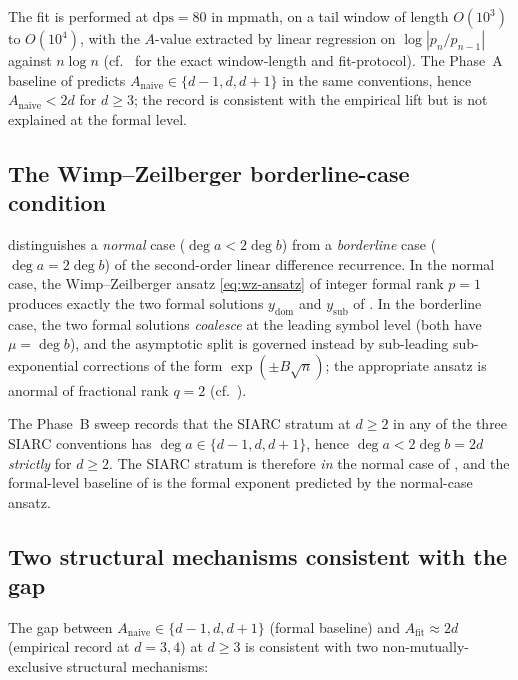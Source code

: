 \documentclass[11pt,reqno]{amsart}
\theoremstyle{plain}
\theoremstyle{definition}
\theoremstyle{remark}
\newcommand{\dps}{\mathrm{dps}}
\newcommand{\Anaive}{A_{\mathrm{naive}}}
\newcommand{\Afit}{A_{\mathrm{fit}}}
\newcommand{\dega}{\deg a}
\newcommand{\degb}{\deg b}
\begin{document}
The fit is performed at $\dps = 80$ in mpmath, on a tail
window of length $O(10^3)$ to $O(10^4)$, with the $A$-value
extracted by linear regression on
$\log|p_n / p_{n-1}|$ against $n \log n$ (cf.\
\cite[\S\S R1, Q1]{papanokechi_pcf2_v13} for the exact
window-length and fit-protocol). The Phase~A baseline of
 predicts $\Anaive \in \{d-1, d, d+1\}$
in the same conventions, hence $\Anaive < 2d$ for $d \ge 3$;
the record is consistent with the empirical lift but is not
explained at the formal level.

\subsection{The Wimp--Zeilberger borderline-case condition}
\label{sec:gap-wz-border}
\cite[\S5]{wimp1984computation} distinguishes a \emph{normal}
case ($\dega < 2\degb$) from a \emph{borderline} case
($\dega = 2\degb$) of the second-order linear difference
recurrence. In the normal case, the Wimp--Zeilberger ansatz
\eqref{eq:wz-ansatz} of integer formal rank $p = 1$ produces
exactly the two formal solutions $y_{\mathrm{dom}}$ and
$y_{\mathrm{sub}}$ of . In the
borderline case, the two formal solutions \emph{coalesce} at
the leading symbol level (both have $\mu = \degb$), and the
asymptotic split is governed instead by sub-leading
sub-exponential corrections of the form $\exp(\pm B\sqrt{n})$;
the appropriate ansatz is anormal of fractional rank $q = 2$
(cf.\ \cite[\S\S5--6]{wimp1984computation}).

The Phase~B sweep \cite[Phase~B]{siarc_t1_phase2} records that
the SIARC stratum at $d \ge 2$ in any of the three SIARC
conventions has $\dega \in \{d-1, d, d+1\}$, hence
$\dega < 2\degb = 2d$ \emph{strictly} for $d \ge 2$. The SIARC
stratum is therefore \emph{in} the normal case of
\cite[\S5]{wimp1984computation}, and the formal-level
baseline of  is the formal exponent
predicted by the normal-case ansatz.

\subsection{Two structural mechanisms consistent with the gap}
\label{sec:gap-mechanisms}

The gap between $\Anaive \in \{d-1, d, d+1\}$ (formal baseline)
and $\Afit \approx 2d$ (empirical record at $d = 3, 4$) at
$d \ge 3$ is consistent with two non-mutually-exclusive
structural mechanisms:
\end{document}
